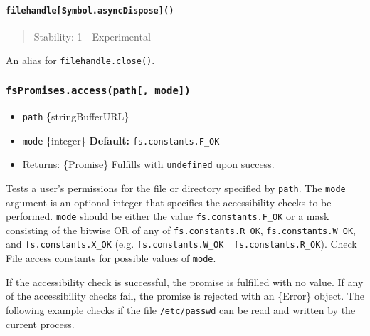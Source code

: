 \paragraph{\texorpdfstring{\texttt{filehandle{[}Symbol.asyncDispose{]}()}}{filehandle{[}Symbol.asyncDispose{]}()}}\label{filehandlesymbol.asyncdispose}

\begin{quote}
Stability: 1 - Experimental
\end{quote}

An alias for \texttt{filehandle.close()}.

\subsubsection{\texorpdfstring{\texttt{fsPromises.access(path{[},\ mode{]})}}{fsPromises.access(path{[}, mode{]})}}\label{fspromises.accesspath-mode}

\begin{itemize}
\tightlist
\item
  \texttt{path} \{string\textbar Buffer\textbar URL\}
\item
  \texttt{mode} \{integer\} \textbf{Default:}
  \texttt{fs.constants.F\_OK}
\item
  Returns: \{Promise\} Fulfills with \texttt{undefined} upon success.
\end{itemize}

Tests a user's permissions for the file or directory specified by
\texttt{path}. The \texttt{mode} argument is an optional integer that
specifies the accessibility checks to be performed. \texttt{mode} should
be either the value \texttt{fs.constants.F\_OK} or a mask consisting of
the bitwise OR of any of \texttt{fs.constants.R\_OK},
\texttt{fs.constants.W\_OK}, and \texttt{fs.constants.X\_OK} (e.g.
\texttt{fs.constants.W\_OK\ \textbar{}\ fs.constants.R\_OK}). Check
\hyperref[file-access-constants]{File access constants} for possible
values of \texttt{mode}.

If the accessibility check is successful, the promise is fulfilled with
no value. If any of the accessibility checks fail, the promise is
rejected with an \{Error\} object. The following example checks if the
file \texttt{/etc/passwd} can be read and written by the current
process.

